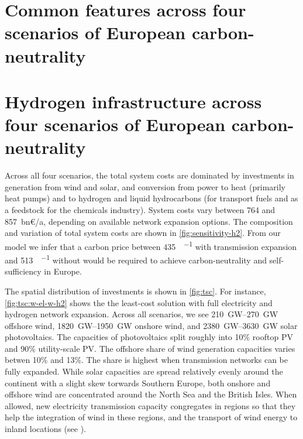 \section*{Common features across four scenarios of European carbon-neutrality}
\section*{Hydrogen infrastructure across four scenarios of European carbon-neutrality}
\label{sec:es}


Across all four scenarios, the total system costs are dominated by investments
in generation from wind and solar, and conversion from power to heat (primarily
heat pumps) and to hydrogen and liquid hydrocarbons (for transport fuels and as
a feedstock for the chemicals industry). System costs vary between 764 and
857~bn\euro/a, depending on available network expansion options. The composition
and variation of total system costs are shown in \cref{fig:sensitivity-h2}. From
our model we infer that a carbon price between \SI{435}{\sieuro\per\tco} with
transmission expansion and \SI{513}{\sieuro\per\tco} without would be required
to achieve carbon-neutrality and self-sufficiency in Europe.


The spatial distribution of investments is shown in \cref{fig:tsc}. For
instance, \cref{fig:tsc:w-el-w-h2} shows the the least-cost solution with full
electricity and hydrogen network expansion. Across all scenarios, we see
\SIrange{210}{270}{\giga\watt} offshore wind, \SIrange{1820}{1950}{\giga\watt}
onshore wind, and \SIrange{2380}{3630}{\giga\watt} solar photovoltaics. The
capacities of photovoltaics split roughly into 10\% rooftop PV and 90\%
utility-scale PV. The offshore share of wind generation capacities varies betwen
10\% and 13\%. The share is highest when transmission networks can be fully
expanded. While solar capacities are spread relatively evenly around the
continent with a slight skew torwards Southern Europe, both onshore and offshore
wind are concentrated around the North Sea and the British Isles. When allowed,
new electricity transmission capacity congregates in regions so that they
help the integration of wind in these regions, and the transport of wind energy
to inland locations (see ).


